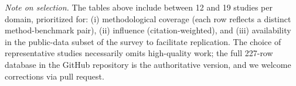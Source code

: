 \noindent\textit{Note on selection.} The tables above include between 12 and 19 studies per domain, prioritized for: (i) methodological coverage (each row reflects a distinct method-benchmark pair), (ii) influence (citation-weighted), and (iii) availability in the public-data subset of the survey to facilitate replication. The choice of representative studies necessarily omits high-quality work; the full 227-row database in the GitHub repository is the authoritative version, and we welcome corrections via pull request.
